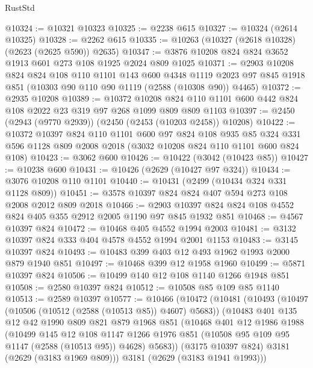 \begin{lexlean}{RustStd}
\begin{coremodule}
@10324 := @10321 @10323
@10325 := @2238 @615
@10327 := @10324 (@2614 @10325)
@10328 := @2262 @615
@10335 := @10263 (@10327 (@2618 @10328) (@2623 (@2625 @590)) @2635)
@10347 := @3876 @10208 @824 @824 @3652 @1913 @601 @273 @108 @1925 @2024 @809 @1025
@10371 := @2903
    @10208
    @824
    @824
    @108
    @110
    @1101
    @143
    @600
    @4348
    @1119
    @2023
    @97
    @845
    @1918
    @851
    (@10303 @90 @110 @90 @1119 (@2588 (@10308 @90)) @4465)
@10372 := @2935 @10208
@10389 := @10372
    @10208
    @824
    @110
    @1101
    @600
    @442
    @824
    @108
    @2022
    @23
    @319
    @97
    @268
    @1099
    @809
    @809
    @1103
@10397 := @2450 (@2943 (@9770 @2939)) (@2450 (@2453 (@10203 @2458)) @10208)
@10422 := @10372
    @10397
    @824
    @110
    @1101
    @600
    @97
    @824
    @108
    @935
    @85
    @324
    @331
    @596
    @1128
    @809
    @2008
    @2018
    (@3032 @10208 @824 @110 @1101 @600 @824 @108)
@10423 := @3062 @600
@10426 := @10422 (@3042 (@10423 @85))
@10427 := @10238 @600
@10431 := @10426 (@2629 (@10427 @97 @324))
@10434 := @3076 @10208 @110 @1101
@10440 := @10431 (@2499 (@10434 @324 @331 @1128 @809))
@10451 := @3578 @10397 @824 @824 @407 @594 @273 @108 @2008 @2012 @809 @2018
@10466 := @2903 @10397 @824 @824 @108 @4552 @824 @405 @355 @2912 @2005 @1190 @97 @845 @1932 @851
@10468 := @4567 @10397 @824
@10472 := @10468 @405 @4552 @1994 @2003
@10481 := @3132 @10397 @824 @333 @404 @4578 @4552 @1994 @2001 @1153
@10483 := @3145 @10397 @824
@10493 := @10483 @399 @403 @12 @493 @1962 @1993 @2000 @879 @1940 @851
@10497 := @10468 @399 @12 @1958 @1960
@10499 := @5871 @10397 @824
@10506 := @10499 @140 @12 @108 @1140 @1266 @1948 @851
@10508 := @2580 @10397 @824
@10512 := @10508 @85 @109 @85 @1140
@10513 := @2589 @10397
@10577 := @10466
    (@10472
      (@10481
        (@10493
          (@10497 (@10506 (@10512 (@2588 (@10513 @85)) @4607) @5683))
          (@10483
            @401
            @135
            @12
            @42
            @1990
            @809
            @821
            @879
            @1968
            @851
            (@10468
              @401
              @12
              @1986
              @1988
              (@10499
                @145
                @12
                @108
                @1147
                @1266
                @1976
                @851
                (@10508 @95 @109 @95 @1147 (@2588 (@10513 @95)) @4628)
                @5683))
            (@3175 @10397 @824)
            @3181
            (@2629 (@3183 @1969 @809)))
          @3181
          (@2629 (@3183 @1941 @1993)))

\end{coremodule}
\end{lexlean}
